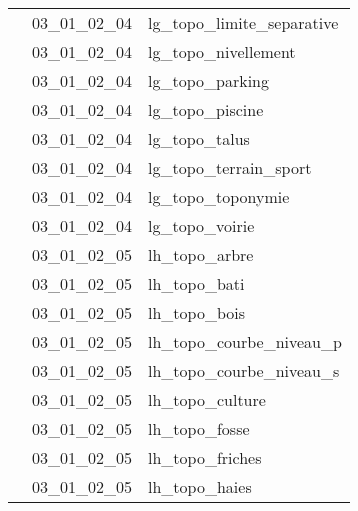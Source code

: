 \documentclass[12pt,titlepage]{book}
\begin{document}
\begin{supertabular}{|p{10cm}|c|p{15cm}|}
                    & 03\_01\_02\_04 & lg\_topo\_limite\_separative\\


                    & 03\_01\_02\_04 & lg\_topo\_nivellement\\


                    & 03\_01\_02\_04 & lg\_topo\_parking\\


                    & 03\_01\_02\_04 & lg\_topo\_piscine\\


                    & 03\_01\_02\_04 & lg\_topo\_talus\\


                    & 03\_01\_02\_04 & lg\_topo\_terrain\_sport\\


                    & 03\_01\_02\_04 & lg\_topo\_toponymie\\


                    & 03\_01\_02\_04 & lg\_topo\_voirie\\


                    & 03\_01\_02\_05 & lh\_topo\_arbre\\


                    & 03\_01\_02\_05 & lh\_topo\_bati\\


                    & 03\_01\_02\_05 & lh\_topo\_bois\\


                    & 03\_01\_02\_05 & lh\_topo\_courbe\_niveau\_p\\


                    & 03\_01\_02\_05 & lh\_topo\_courbe\_niveau\_s\\


                    & 03\_01\_02\_05 & lh\_topo\_culture\\


                    & 03\_01\_02\_05 & lh\_topo\_fosse\\


                    & 03\_01\_02\_05 & lh\_topo\_friches\\


                    & 03\_01\_02\_05 & lh\_topo\_haies\\



\end{supertabular}
\end{document}
